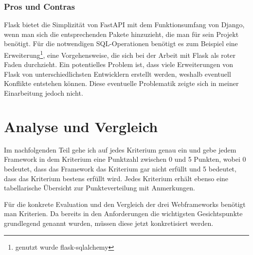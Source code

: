 \documentclass[letterpaper,11pt,leqno]{article}
\begin{document}
\subsubsection{Pros und Contras}
Flask bietet die Simplizität von FastAPI mit dem Funktionsumfang von Django, wenn man sich die
entsprechenden Pakete hinzuzieht, die man für sein Projekt benötigt. Für die notwendigen
SQL-Operationen benötigt es zum Beispiel eine Erweiterung\footnote{genutzt wurde flask-sqlalchemy},
eine Vorgehensweise, die sich bei der Arbeit mit Flask als roter Faden durchzieht. Ein potentielles
Problem ist, dass viele Erweiterungen von Flask von unterschiedlichsten Entwicklern erstellt werden,
weshalb eventuell Konflikte entstehen können. Diese eventuelle Problematik zeigte sich in meiner
Einarbeitung jedoch nicht.

\section{Analyse und Vergleich}
Im nachfolgenden Teil gehe ich auf jedes Kriterium genau ein und gebe jedem Framework in dem
Kriterium eine Punktzahl zwischen 0 und 5 Punkten, wobei 0 bedeutet, dass das Framework das
Kriterium gar nicht erfüllt und 5 bedeutet, dass das Kriterium bestens erfüllt wird. Jedes Kriterium
erhält ebenso eine tabellarische Übersicht zur Punkteverteilung mit Anmerkungen.

Für die konkrete Evaluation und den Vergleich der drei Webframeworks benötigt man Kriterien. Da
bereits in den Anforderungen die wichtigsten Gesichtspunkte grundlegend genannt wurden, müssen diese
jetzt konkretisiert werden.
\end{document}
